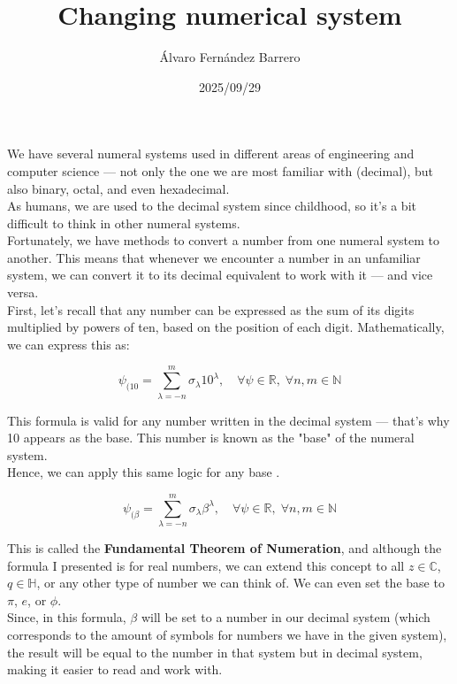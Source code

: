 \documentclass[12pt]{article}
\title{Changing numerical system}
\author{Álvaro Fernández Barrero}
\date{2025/09/29}
\begin{document}
\maketitle

We have several numeral systems used in different areas of engineering and computer science — not only the one we are most familiar with (decimal), but also binary, octal, and even hexadecimal.\\

As humans, we are used to the decimal system since childhood, so it's a bit difficult to think in other numeral systems.\\

Fortunately, we have methods to convert a number from one numeral system to another. This means that whenever we encounter a number in an unfamiliar system, we can convert it to its decimal equivalent to work with it — and vice versa.\\

First, let's recall that any number can be expressed as the sum of its digits multiplied by powers of ten, based on the position of each digit. Mathematically, we can express this as:

\[
    \psi_{(10} = \sum_{\lambda = -n}^{m} \sigma_{\lambda} 10^{\lambda}, \quad \forall \psi \in \mathbb{R}, \; \forall n,m \in \mathbb{N}
\]

This formula is valid for any number written in the decimal system — that's why 10 appears as the base. This number is known as the "base" of the numeral system.\\

Hence, we can apply this same logic for any base \beta.

\[
	\psi_{(\beta} = \sum_{\lambda = -n}^{m} \sigma_{\lambda} \beta^{\lambda}, \quad  \forall \psi \in \mathbb{R}, \; \forall n,m \in \mathbb{N}
\]

This is called the \textbf{Fundamental Theorem of Numeration}, and although the formula I presented is for real numbers, we can extend this concept to all \( z \in \mathbb{C} \), \( q \in \mathbb{H} \), or any other type of number we can think of. We can even set the base to \( \pi \), \( e \), or \( \phi \).\\

Since, in this formula, \(\beta \) will be set to a number in our decimal system (which corresponds to the amount of symbols for numbers we have in the given system), the result will be equal to the number in that system but in decimal system, making it easier to read and work with.\\
\end{document}
